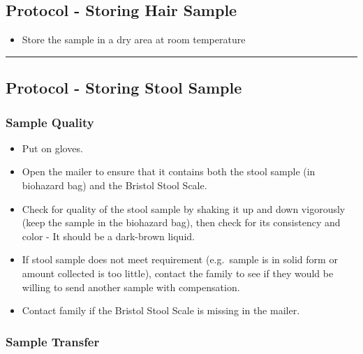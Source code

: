 \documentclass[]{book}
\providecommand{\tightlist}{%
  \setlength{\itemsep}{0pt}\setlength{\parskip}{0pt}}
\begin{document}
\hypertarget{protocol---storing-hair-sample-2}{%
\subsection{Protocol - Storing Hair Sample}\label{protocol---storing-hair-sample-2}}

\begin{itemize}
\tightlist
\item
  Store the sample in a dry area at room temperature
\end{itemize}

\begin{center}\rule{0.5\linewidth}{0.5pt}\end{center}

\hypertarget{protocol---storing-stool-sample-2}{%
\subsection{Protocol - Storing Stool Sample}\label{protocol---storing-stool-sample-2}}

\hypertarget{sample-quality-3}{%
\subsubsection{Sample Quality}\label{sample-quality-3}}

\begin{itemize}
\item
  Put on gloves.
\item
  Open the mailer to ensure that it contains both the stool sample (in biohazard bag) and the Bristol Stool Scale.
\item
  Check for quality of the stool sample by shaking it up and down vigorously (keep the sample in the biohazard bag), then check for its consistency and color - It should be a dark-brown liquid.
\item
  If stool sample does not meet requirement (e.g.~sample is in solid form or amount collected is too little), contact the family to see if they would be willing to send another sample with compensation.
\item
  Contact family if the Bristol Stool Scale is missing in the mailer.
\end{itemize}

\hypertarget{sample-transfer-3}{%
\subsubsection{Sample Transfer}\label{sample-transfer-3}}
\end{document}
